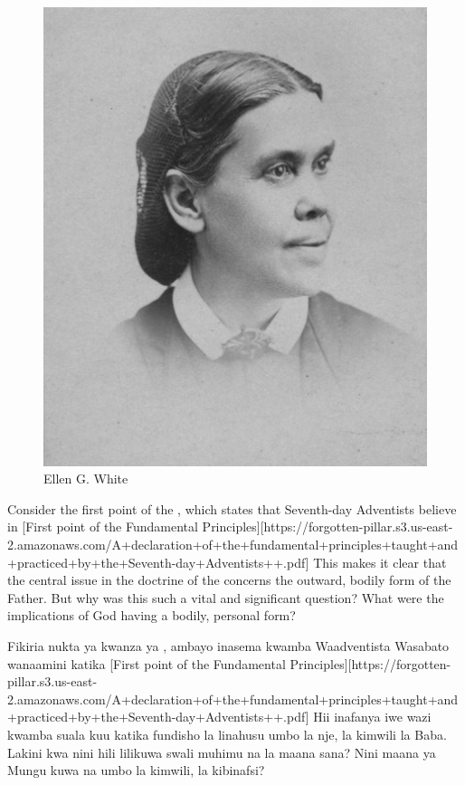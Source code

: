 \begin{figure}[t]
    \centering
    \includegraphics[width=0.65\linewidth]{images/ellen-white.jpg}
    \caption*{Ellen G. White}
    \label{fig:ellen-g-white}
\end{figure}


Consider the first point of the , which states that Seventh-day Adventists believe in [First point of the Fundamental Principles][https://forgotten-pillar.s3.us-east-2.amazonaws.com/A+declaration+of+the+fundamental+principles+taught+and+practiced+by+the+Seventh-day+Adventists++.pdf] This makes it clear that the central issue in the doctrine of the  concerns the outward, bodily form of the Father. But why was this such a vital and significant question? What were the implications of God having a bodily, personal form?


Fikiria nukta ya kwanza ya , ambayo inasema kwamba Waadventista Wasabato wanaamini katika [First point of the Fundamental Principles][https://forgotten-pillar.s3.us-east-2.amazonaws.com/A+declaration+of+the+fundamental+principles+taught+and+practiced+by+the+Seventh-day+Adventists++.pdf] Hii inafanya iwe wazi kwamba suala kuu katika fundisho la  linahusu umbo la nje, la kimwili la Baba. Lakini kwa nini hili lilikuwa swali muhimu na la maana sana? Nini maana ya Mungu kuwa na umbo la kimwili, la kibinafsi?


